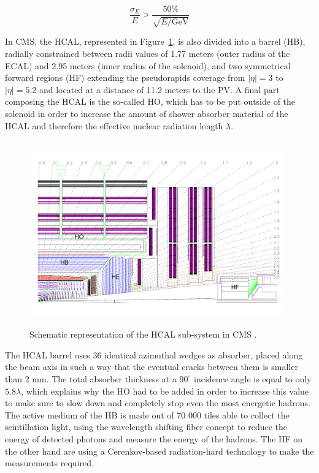 \documentclass[a4paper, 10pt, openright]{report}
\begin{document}
\begin{equation}
\label{eq:HCALRes}
\frac{\sigma_E}{E} > \frac{50\%}{\sqrt{E/\text{GeV}}}
\end{equation}

In \ac{CMS}, the \ac{HCAL}, represented in Figure~\ref{fig:CMSHCAL}, is also divided into a barrel (HB), radially constrained between radii values of 1.77 meters (outer radius of the \ac{ECAL}) and 2.95 meters (inner radius of the solenoid), and two symmetrical forward regions (HF) extending the pseudorapids coverage from $|\eta| = 3$ to $|\eta| = 5.2$ and located at a distance of 11.2 meters to the \ac{PV}. A final part composing the \ac{HCAL} is the so-called \ac{HO}, which has to be put outside of the solenoid in order to increase the amount of shower absorber material of the \ac{HCAL} and therefore the effective nuclear radiation length $\lambda$.

\begin{figure}[htbp]
\begin{center}
\includegraphics[width=11cm, height=8cm]{figs/CMSHCAL.png}
\caption{Schematic representation of the \ac{HCAL} sub-system in \ac{CMS} \cite{CMSDescription}.}
\label{fig:CMSHCAL}
\end{center}
\end{figure}

The \ac{HCAL} barrel uses 36 identical azimuthal wedges as absorber, placed along the beam axis in such a way that the eventual cracks between them is smaller than 2 mm. The total absorber thickness at a $90^{\circ}$ incidence angle is equal to only $5.8 \lambda$, which explains why the \ac{HO} had to be added in order to increase this value to make sure to slow down and completely stop even the most energetic hadrons. The active medium of the HB is made out of 70 000 tiles able to collect the scintillation light, using the wavelength shifting fiber concept to reduce the energy of detected photons and measure the energy of the hadrons. The HF on the other hand are using a Cerenkov-based radiation-hard technology to make the measurements required.
\end{document}
